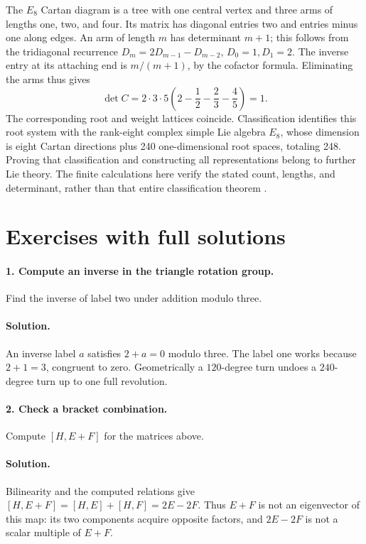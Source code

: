 The $E_8$ Cartan diagram is a tree with one central vertex and three arms
of lengths one, two, and four. Its matrix has diagonal entries two and
entries minus one along edges. An arm of length $m$ has determinant $m+1$;
this follows from the tridiagonal recurrence $D_m=2D_{m-1}-D_{m-2}$,
$D_0=1,D_1=2$. The inverse entry at its attaching end is $m/(m+1)$,
by the cofactor formula. Eliminating the arms thus gives
\[
 \det C=2\cdot3\cdot5
 \left(2-\frac12-\frac23-\frac45\right)=1.
\]
The corresponding root and weight lattices coincide. Classification identifies
this root system with the rank-eight complex simple Lie algebra $E_8$,
whose dimension is eight Cartan directions plus 240 one-dimensional root
spaces, totaling 248. Proving that classification and constructing all
representations belong to further Lie theory. The finite calculations here
verify the stated count, lengths, and determinant, rather than that entire
classification theorem \citep{kac1990infinite}.

\section{Exercises with full solutions}
\paragraph{1. Compute an inverse in the triangle rotation group.}
Find the inverse of label two under addition modulo three.

\paragraph{Solution.}
An inverse label $a$ satisfies $2+a=0$ modulo three. The label one works
because $2+1=3$, congruent to zero. Geometrically a $120$-degree turn
undoes a $240$-degree turn up to one full revolution.

\paragraph{2. Check a bracket combination.}
Compute $[H,E+F]$ for the matrices above.

\paragraph{Solution.}
Bilinearity and the computed relations give
$[H,E+F]=[H,E]+[H,F]=2E-2F$.
Thus $E+F$ is not an eigenvector of this map: its two components acquire
opposite factors, and $2E-2F$ is not a scalar multiple of $E+F$.

